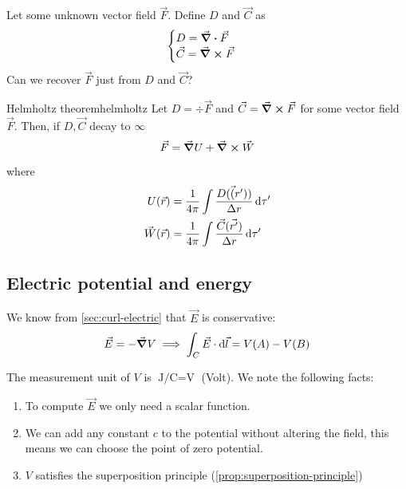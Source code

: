 \documentclass[12pt]{extarticle}
\begin{document}
Let some unknown vector field $\vec F$. Define $D$ and $\vec C$ as
\begin{equation}
    \begin{cases}
        D = \div \vec F \\
        \vec C = \curl \vec F
    \end{cases}
\end{equation}
Can we recover $\vec F$ just from $D$ and $\vec C$?

\begin{theorem}{Helmholtz theorem}{helmholtz}
    Let $D = \div \vec F$ and $\vec C = \curl \vec F$ for some vector field $\vec F$.
    Then, if $D, \vec C$ decay to $\infty$ 
    \begin{equation}
        \vec F = \grad U + \curl \vec W
    \end{equation}
    where
    \begin{align}
        U(\vec r)       & = \frac{1}{4 \pi} \int \frac{D(\vec(r'))}{\Delta r} \dd{\tau'} \label{eq:helmholtz_1}      \\
        \vec W (\vec r) & = \frac{1}{4 \pi} \int\frac{\vec C(\vec {r'})}{\Delta r} \dd{\tau'} \label{eq:helmholtz_2}
    \end{align}
\end{theorem}

\subsection{Electric potential and energy}

We know from \cref{sec:curl-electric} that $\vec E$ is conservative:
\begin{equation}
    \vec E = - \grad V \implies \int_C \vec E \cdot \dd{\vec l} = V(A) - V(B)
\end{equation}

The measurement unit of $V$ is $\si{\joule \per \coulomb} = \si{\volt}$ (Volt).
We note the following facts:
\begin{enumerate}[label=\roman*.]
    \item To compute $\vec E$ we only need a scalar function.
    \item We can add any constant $c$ to the potential without altering the field, this means we can choose the point of zero potential.
    \item $V$ satisfies the superposition principle (\cref{prop:superposition-principle})
\end{enumerate}
\end{document}
